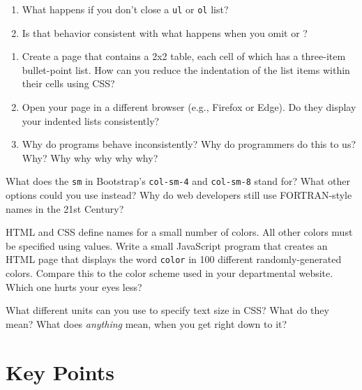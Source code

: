 \begin{enumerate}
\item
  What happens if you don't close a \texttt{ul} or \texttt{ol} list?
\item
  Is that behavior consistent with what happens when you omit \texttt{} or \texttt{}?
\end{enumerate}


\begin{enumerate}
\item
  Create a page that contains a 2x2 table,
  each cell of which has a three-item bullet-point list.
  How can you reduce the indentation of the list items within their cells using CSS?
\item
  Open your page in a different browser (e.g., Firefox or Edge).
  Do they display your indented lists consistently?
\item
  Why do programs behave inconsistently?
  Why do programmers do this to us?
  Why?
  Why why why why why?
\end{enumerate}


What does the \texttt{sm} in Bootstrap's \texttt{col-sm-4} and \texttt{col-sm-8} stand for?
What other options could you use instead?
Why do web developers still use FORTRAN-style names in the 21st Century?


HTML and CSS define names for a small number of colors.
All other colors must be specified using  values.
Write a small JavaScript program that creates an HTML page
that displays the word \texttt{color} in 100 different randomly-generated colors.
Compare this to the color scheme used in your departmental website.
Which one hurts your eyes less?


What different units can you use to specify text size in CSS?
What do they mean?
What does \emph{anything} mean, when you get right down to it?

\section*{Key Points}


